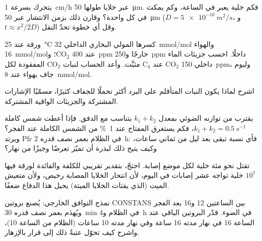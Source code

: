 \begin{exercise}[$\star\star$]\label{exo:b3:plant-molecular-physiology:7}
يتحرك  بسرعة \qty{1}{cm/h} عبر خلايا طولها
\qty{50}{\micro m}. فكم خلية يعبر في الساعة، وكم يمكث في كل
واحدة؟ وقارن ذلك بزمن الانتشار عبر \qty{50}{\micro m} ($D =
\qty{5e-10}{m^2/s}$، و$t \approx x^{2}/2D$) وقل أي خطوة تحدّ النقل.
\end{exercise}

\begin{exercise}[$\star\star$]\label{exo:b3:plant-molecular-physiology:8}
ورقة عند \qty{25}{\celsius} كسرها المولي البخاري الداخلي
\qty{32}{mmol/mol} والهواء \qty{16}{mmol/mol}؛ وCO$_{2}$ عند
\qty{400}{ppm} خارجًا و\qty{250}{ppm} داخلًا. احسب جزيئات الماء
المفقودة لكل CO$_{2}$ مثبَّت. وأعد الحساب لنبات C$_{4}$ عند
CO$_{2}$ داخلي \qty{150}{ppm}، وليوم جاف بهواء عند
\qty{8}{mmol/mol}.
\end{exercise}

\begin{exercise}[$\star\star$]\label{exo:b3:plant-molecular-physiology:9}
اشرح لماذا يكون النبات المتأقلم على البرد أكثر تحملًا للجفاف
كثيرًا، مسمّيًا الإشارات المشتركة والجزيئات الواقية المشتركة.
\end{exercise}

\begin{exercise}[$\star\star\star$]\label{exo:b3:plant-molecular-physiology:10}
يقترب  من توازنه الضوئي بمعدل $k_{1} + k_{2}$
يتناسب مع الدفق. فإذا أعطت شمس كاملة $k_{1} + k_{2} =
\qty{0.5}{s^{-1}}$، فكم يستغرق المفتاح عند \qty{1}{\%} من
الشمس الكاملة عند الفجر؟ ويرتد Pfr في الظلام بعمر نصف قدره
\qty{2}{h}: فأي نسبة تبقى بعد ليل من ثماني ساعات، وكيف يتيح
ذلك لبذرة أن تميّز تعرضًا وجيزًا من نهار؟
\end{exercise}

\begin{exercise}[$\star\star\star$]\label{exo:b3:plant-molecular-physiology:11}
تقتل  نحو مئة خلية لكل موضع إصابة.
احتجّ، بتقدير تقريبي للكلفة والفائدة لورقة فيها $10^{7}$
خلية تواجه عشر إصابات في اليوم، لأن انتحار الخلايا المصابة
رخيص، ولأن متعيش الميت (الذي يقتات الخلايا الميتة) يحيل هذا
الدفاع ضعفًا.
\end{exercise}

\begin{exercise}[$\star\star\star$]\label{exo:b3:plant-molecular-physiology:12}
نمذج التوافق الخارجي: يُصنع بروتين CONSTANS بين الساعتين 12
و16 بعد الفجر ويُهدَم بعمر نصف قدره \qty{30}{min} في الظلام
و\qty{4}{h} في الضوء. قدّر البروتين الباقي عند الساعة 16 في
نهار مدته 16 ساعة وفي نهار مدته 10 ساعات (الظلام من الساعة
10)، واشرح كيف تحوّل عتبةٌ ذلك إلى قرار بالإزهار.
\end{exercise}

